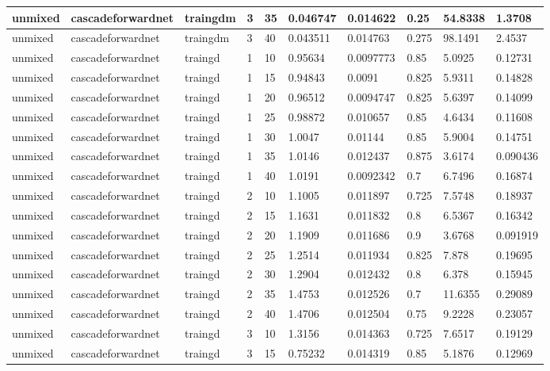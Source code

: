 \begin{longtable}{lllllllll}
unmixed & cascadeforwardnet & traingdm & 3 & 35 & 0.046747 & 0.014622 & 0.25 & 54.8338 & 1.3708 \\ \hline 
unmixed & cascadeforwardnet & traingdm & 3 & 40 & 0.043511 & 0.014763 & 0.275 & 98.1491 & 2.4537 \\ \hline 
unmixed & cascadeforwardnet & traingd & 1 & 10 & 0.95634 & 0.0097773 & 0.85 & 5.0925 & 0.12731 \\ \hline 
unmixed & cascadeforwardnet & traingd & 1 & 15 & 0.94843 & 0.0091 & 0.825 & 5.9311 & 0.14828 \\ \hline 
unmixed & cascadeforwardnet & traingd & 1 & 20 & 0.96512 & 0.0094747 & 0.825 & 5.6397 & 0.14099 \\ \hline 
unmixed & cascadeforwardnet & traingd & 1 & 25 & 0.98872 & 0.010657 & 0.85 & 4.6434 & 0.11608 \\ \hline 
unmixed & cascadeforwardnet & traingd & 1 & 30 & 1.0047 & 0.01144 & 0.85 & 5.9004 & 0.14751 \\ \hline 
unmixed & cascadeforwardnet & traingd & 1 & 35 & 1.0146 & 0.012437 & 0.875 & 3.6174 & 0.090436 \\ \hline 
unmixed & cascadeforwardnet & traingd & 1 & 40 & 1.0191 & 0.0092342 & 0.7 & 6.7496 & 0.16874 \\ \hline 
unmixed & cascadeforwardnet & traingd & 2 & 10 & 1.1005 & 0.011897 & 0.725 & 7.5748 & 0.18937 \\ \hline 
unmixed & cascadeforwardnet & traingd & 2 & 15 & 1.1631 & 0.011832 & 0.8 & 6.5367 & 0.16342 \\ \hline 
unmixed & cascadeforwardnet & traingd & 2 & 20 & 1.1909 & 0.011686 & 0.9 & 3.6768 & 0.091919 \\ \hline 
unmixed & cascadeforwardnet & traingd & 2 & 25 & 1.2514 & 0.011934 & 0.825 & 7.878 & 0.19695 \\ \hline 
unmixed & cascadeforwardnet & traingd & 2 & 30 & 1.2904 & 0.012432 & 0.8 & 6.378 & 0.15945 \\ \hline 
unmixed & cascadeforwardnet & traingd & 2 & 35 & 1.4753 & 0.012526 & 0.7 & 11.6355 & 0.29089 \\ \hline 
unmixed & cascadeforwardnet & traingd & 2 & 40 & 1.4706 & 0.012504 & 0.75 & 9.2228 & 0.23057 \\ \hline 
unmixed & cascadeforwardnet & traingd & 3 & 10 & 1.3156 & 0.014363 & 0.725 & 7.6517 & 0.19129 \\ \hline 
unmixed & cascadeforwardnet & traingd & 3 & 15 & 0.75232 & 0.014319 & 0.85 & 5.1876 & 0.12969 \\ \hline 

\end{longtable}

